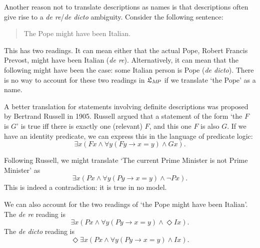 Another reason not to translate descriptions as names is that descriptions often
give rise to a \emph{de re}/\emph{de dicto} ambiguity. Consider the following
sentence:
\begin{quote}
  The Pope might have been Italian.
\end{quote}
This has two readings. It can mean either that the actual Pope, Robert Francis Prevost, might have been Italian (\emph{de re}). Alternatively, it can mean
that the following might have been the case: some Italian person is Pope
(\emph{de dicto}). There is no way to account for these two readings in
$\mathfrak{L}_{M\!P}$ if we translate `the Pope' as a name. 

A better translation for statements involving definite descriptions was proposed
by Bertrand Russell in 1905. Russell argued that a statement of the form `the
$F$ is $G$' is true iff there is exactly one (relevant) $F$, and
this one $F$ is also $G$. If we have an identity predicate, we can 
express this in the language of predicate logic:
\[
  \exists x(Fx \land \forall y(Fy \to x\!=\!y) \land Gx). 
\]

Following Russell, we might translate `The current Prime Minister is not Prime
Minister' as
\[
  \exists x(Px \land \forall y(Py \to x\!=\!y) \land \neg Px).
\]
This is indeed a contradiction: it is true in no model.

We can also account for the two readings of `the Pope might have been Italian'.
The \emph{de re} reading is
\[
  \exists x (Px \land \forall y(Py \to x\!=\!y) \land \Diamond Ix).
\]
The \emph{de dicto} reading is
\[
  \Diamond \exists x (Px \land \forall y(Py \to x\!=\!y) \land Ix).
\]


